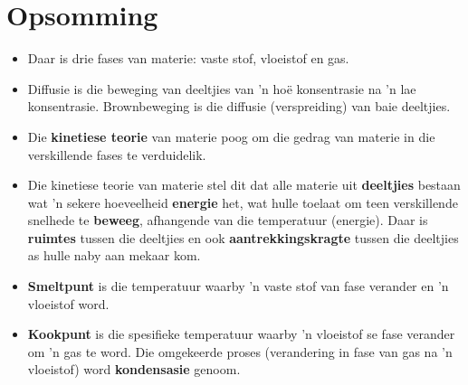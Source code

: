             \section{Opsomming}
            \nopagebreak
\label{m38730*id311034}\begin{itemize}[noitemsep]
            \label{m38730*id973}\item Daar is drie fases van materie: vaste stof, vloeistof en gas.
\label{m38730*id872}\item Diffusie is die beweging van deeltjies van 'n hoë konsentrasie na 'n lae konsentrasie. Brownbeweging is die diffusie (verspreiding) van baie deeltjies.
\label{m38730*uid80}\item Die \textbf{kinetiese teorie} van materie poog om die gedrag van materie in die verskillende fases te verduidelik.
\label{m38730*uid81}\item Die kinetiese teorie van materie stel dit dat alle materie uit \textbf{deeltjies} bestaan wat 'n sekere hoeveelheid \textbf{energie} het, wat hulle toelaat om teen verskillende snelhede te \textbf{beweeg}, afhangende van die temperatuur (energie). Daar is \textbf{ruimtes} tussen die deeltjies en ook \textbf{aantrekkingskragte} tussen die deeltjies as hulle naby aan mekaar kom.
\label{m38730*uid83}\item \textbf{Smeltpunt} is die temperatuur waarby 'n vaste stof van fase verander en 'n vloeistof word.
\label{m38730*uid84}\item \textbf{Kookpunt} is die spesifieke temperatuur waarby 'n vloeistof se fase verander om 'n gas te word. Die omgekeerde proses (verandering in fase van gas na 'n vloeistof) word \textbf{kondensasie} genoom.
\end{itemize}
\label{m38730*cid9}
